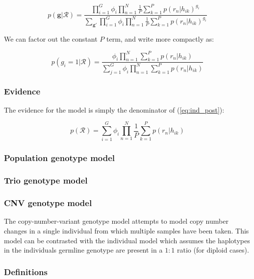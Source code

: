 \documentclass{article}
\begin{document}
\begin{equation}
\label{eq:ind_post}
 p(\boldsymbol{g} | \mathcal{R}) = \frac{\prod_{i = 1}^G \phi_i \prod^N_{n = 1} \frac{1}{P} \sum^P_{k = 1} p(r_n | h_{ik})^{g_i}}{\sum_{\boldsymbol{g}'}\prod_{i = 1}^G \phi_i \prod^N_{n = 1} \frac{1}{P} \sum^P_{k = 1} p(r_n | h_{ik})^{g_i}}
\end{equation}

We can factor out the constant $P$ term, and write more compactly as:

\begin{equation}
\label{eq:ind_post2}
 p(g_i = 1 | \mathcal{R}) = \frac{\phi_i \prod^N_{n = 1} \sum^P_{k = 1} p(r_n | h_{ik})}{\sum_{j = 1}^G \phi_i \prod^N_{n = 1} \sum^P_{k = 1} p(r_n | h_{ik})}
\end{equation}

\subsubsection{Evidence}

The evidence for the model is simply the denominator of (\ref{eq:ind_post}):

\begin{equation}
\label{eq:ind_ev}
 p(\mathcal{R}) = \sum_{i = 1}^G \phi_i \prod^N_{n = 1} \frac{1}{P} \sum^P_{k = 1} p(r_n | h_{ik})
\end{equation}

\subsubsection{Population genotype model}

\subsubsection{Trio genotype model}

\subsubsection{CNV genotype model}

The copy-number-variant genotype model attempts to model copy number changes in a single individual from which multiple samples have been taken. This model can be contrasted with the individual model which assumes the haplotypes in the individuals germline genotype are present in a $1:1$ ratio (for diploid cases).

\subsubsection{Definitions}
\end{document}
